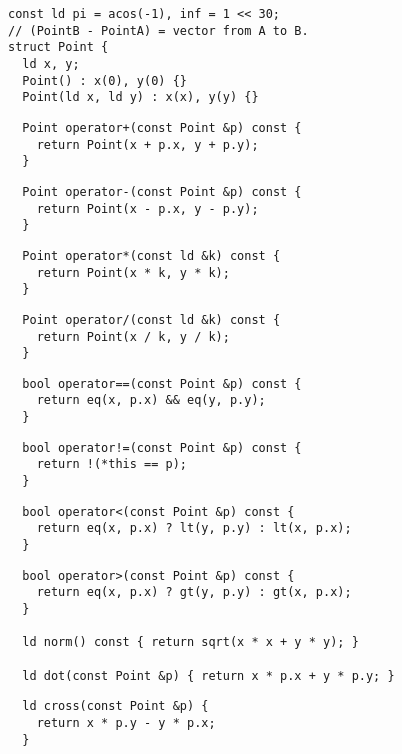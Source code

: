 \documentclass[twoside]{article}
\begin{document}
\begin{multicols*}{2}
\begin{verbatim}
const ld pi = acos(-1), inf = 1 << 30;
// (PointB - PointA) = vector from A to B.
struct Point {
  ld x, y;
  Point() : x(0), y(0) {}
  Point(ld x, ld y) : x(x), y(y) {}
\end{verbatim}
\vspace{-12pt}
\begin{verbatim}
  Point operator+(const Point &p) const {
    return Point(x + p.x, y + p.y);
  }
\end{verbatim}
\vspace{-12pt}
\begin{verbatim}
  Point operator-(const Point &p) const {
    return Point(x - p.x, y - p.y);
  }
\end{verbatim}
\vspace{-12pt}
\begin{verbatim}
  Point operator*(const ld &k) const {
    return Point(x * k, y * k);
  }
\end{verbatim}
\vspace{-12pt}
\begin{verbatim}
  Point operator/(const ld &k) const {
    return Point(x / k, y / k);
  }
\end{verbatim}
\vspace{-12pt}
\begin{verbatim}
  bool operator==(const Point &p) const {
    return eq(x, p.x) && eq(y, p.y);
  }
\end{verbatim}
\vspace{-12pt}
\begin{verbatim}
  bool operator!=(const Point &p) const {
    return !(*this == p);
  }
\end{verbatim}
\vspace{-12pt}
\begin{verbatim}
  bool operator<(const Point &p) const {
    return eq(x, p.x) ? lt(y, p.y) : lt(x, p.x);
  }
\end{verbatim}
\vspace{-12pt}
\begin{verbatim}
  bool operator>(const Point &p) const {
    return eq(x, p.x) ? gt(y, p.y) : gt(x, p.x);
  }

  ld norm() const { return sqrt(x * x + y * y); }

  ld dot(const Point &p) { return x * p.x + y * p.y; }
\end{verbatim}
\vspace{-12pt}
\begin{verbatim}
  ld cross(const Point &p) {
    return x * p.y - y * p.x;
  }


\end{verbatim}
\end{multicols*}
\end{document}
